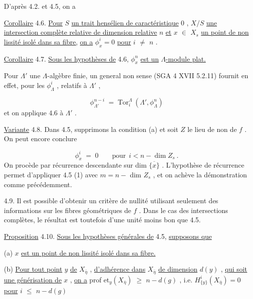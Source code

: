 D'après 4.2. et 4.5, on a

\underline{Corollaire} 4.6.  \underline{Pour}  $S$  \underline{un trait hensélien de caractéristique} 0 ,  $X/S$  \underline{une intersection complète relative de dimension relative}  $n$  \underline{et}  $x$ $\in$ $X_s$  \underline{un point de non lissité isolé dans sa fibre,} \underline{on a}  $\phi^i_x = 0$  \underline{pour}  $i$ $\neq$ $n$ .

\underline{Corollaire} 4.7.  \underline{Sous les hypothèses de} 4.6,  $\phi^n_x$  \underline{est un}  \underline{$\Lambda$-module plat.}

Pour  $\Lambda'$  une $\Lambda$-algèbre finie, un general non sense (SGA 4 XVII 5.2.11) fournit en effet, pour les  $\phi^i_{\Lambda}$ , relatifs à  $\Lambda'$ ,



\begin{equation*}
\phi^{n-i}_{\Lambda'} \;=\; \mathrm{Tor}^{\Lambda}_{i}\ (\Lambda',\phi^n_{\Lambda})
\end{equation*}
et on applique 4.6 à  $\Lambda'$  .

\underline{Variante} 4.8.  Dans 4.5, supprimons la condition (a) et soit  $Z$  le lieu de non de  $f$ . On peut encore conclure

\begin{equation*}
\phi^i_x \;=\; 0 \qquad \text{pour}\ \ i < n - \dim Z_s\ .
\end{equation*}
On procède par récurrence descendante sur  dim $\overline{\{x\}}$ . L'hypothèse de récurrence permet d'appliquer 4.5 (1) avec  $m = n -$ dim $Z_s$ , et on achève la démonstration comme précédemment.

4.9.  Il est possible d'obtenir un critère de nullité utilisant seulement des informations sur les fibres géométriques de  $f$ . Dans le cas des intersections complètes, le résultat est toutefois d'une unité moins bon que 4.5.

\underline{Proposition} 4.10.  \underline{Sous les hypothèses générales de} 4.5, \underline{supposons que}

(a)  $x$  \underline{est un point de non lissité isolé dans sa fibre.}

(b) \underline{Pour tout point}  $y$  \underline{de}  $X_{\bar{\eta}}$  , \underline{d'adhérence dans}  $X_{\bar{\eta}}$  \underline{de dimension} $d(y)$ , \underline{qui soit une générisation de}  $x$ , \underline{on a}  prof et$_y(X_{\bar{\eta}})$ $\geqslant$ $n - d(g)$ ,  i.e. $H^i_{\{y\}}(X_{\bar{\eta}}) = 0$ \underline{pour}  $i$ $\leqslant$ $n - d(g)$

